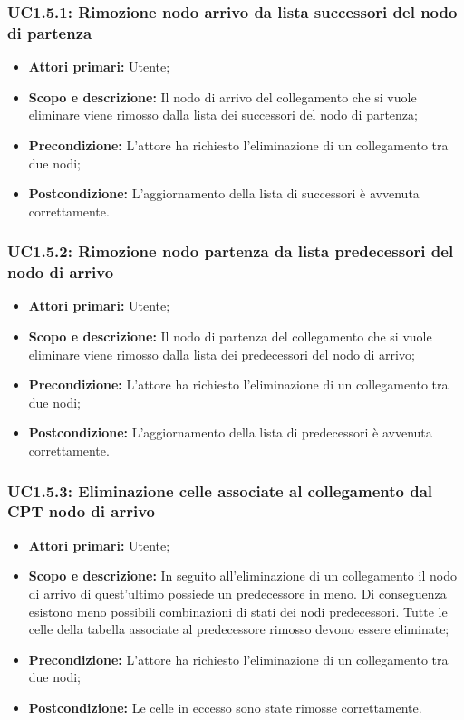 \subsubsection{UC1.5.1: Rimozione nodo arrivo da lista successori del nodo di partenza} 
\begin{itemize} 
	\item{\textbf{Attori primari:} Utente;} 
	\item{\textbf{Scopo e descrizione:} Il nodo di arrivo del collegamento che si vuole eliminare viene rimosso dalla lista dei successori del nodo di partenza;} 
	\item{\textbf{Precondizione:} L'attore ha richiesto l'eliminazione di un collegamento tra due nodi;} 
	\item{\textbf{Postcondizione:} L'aggiornamento della lista di successori è avvenuta correttamente.} 
\end{itemize} 
\subsubsection{UC1.5.2: Rimozione nodo partenza da lista predecessori del nodo di arrivo} 
\begin{itemize} 
	\item{\textbf{Attori primari:} Utente;} 
	\item{\textbf{Scopo e descrizione:} Il nodo di partenza del collegamento che si vuole eliminare viene rimosso dalla lista dei predecessori del nodo di arrivo;} 
	\item{\textbf{Precondizione:} L'attore ha richiesto l'eliminazione di un collegamento tra due nodi;} 
	\item{\textbf{Postcondizione:} L'aggiornamento della lista di predecessori è avvenuta correttamente.} 
\end{itemize} 
\subsubsection{UC1.5.3: Eliminazione celle associate al collegamento dal CPT nodo di arrivo} 
\begin{itemize} 
	\item{\textbf{Attori primari:} Utente;} 
	\item{\textbf{Scopo e descrizione:} In seguito all'eliminazione di un collegamento il nodo di arrivo di quest'ultimo possiede un predecessore in meno. Di conseguenza esistono meno possibili combinazioni di stati dei nodi predecessori. Tutte le celle della tabella associate al predecessore rimosso devono essere eliminate;} 
	\item{\textbf{Precondizione:} L'attore ha richiesto l'eliminazione di un collegamento tra due nodi;} 
	\item{\textbf{Postcondizione:} Le celle in eccesso sono state rimosse correttamente.} 
\end{itemize} 
